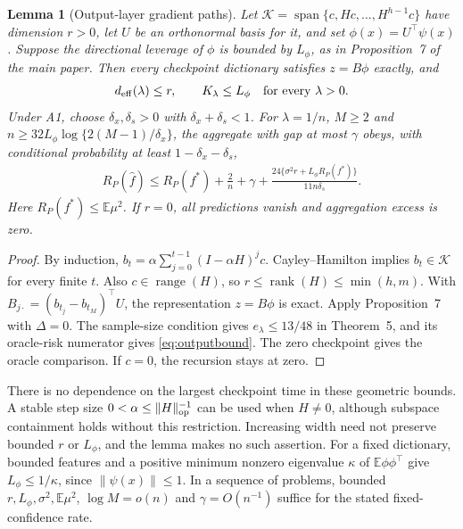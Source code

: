 \documentclass[pdflatex,sn-mathphys-ay]{sn-jnl}
\newtheorem{pathlemma}{Lemma}\renewcommand{\thepathlemma}{S\arabic{pathlemma}}
\theoremstyle{remark}\newtheorem{remark}[theorem]{Remark}
\newcommand{\E}{\mathbb E}
\begin{document}
\begin{pathlemma}[Output-layer gradient paths]\label{lem:outputpath}
Let $\mathcal K=\operatorname{span}\{c,Hc,\ldots,H^{h-1}c\}$ have dimension $r>0$, let $U$ be an orthonormal basis for it, and set $\phi(x)=U^\top\psi(x)$. Suppose the directional leverage of $\phi$ is bounded by $L_\phi$, as in Proposition~7 of the main paper. Then every checkpoint dictionary satisfies $z=B\phi$ exactly, and
\[
 d_{\rm eff}(\lambda)\leq r,\qquad K_\lambda\leq L_\phi
 \quad\text{for every }\lambda>0.
\]
Under A1, choose $\delta_x,\delta_s>0$ with $\delta_x+\delta_s<1$. For $\lambda=1/n$, $M\geq2$ and
$n\geq32L_\phi\log\{2(M-1)/\delta_x\}$, the aggregate with gap at most $\gamma$ obeys, with conditional probability at least $1-\delta_x-\delta_s$,
\begin{align}
 R_P(\hat f)\leq R_P(f^*)+\frac2n+\gamma
 +\frac{24\{\sigma^2r+L_\phi R_P(f^*)\}}{11n\delta_s}.
 \label{eq:outputbound}
\end{align}
Here $R_P(f^*)\leq\E\mu^2$. If $r=0$, all predictions vanish and aggregation excess is zero.
\end{pathlemma}
\begin{proof}
By induction, $b_t=\alpha\sum_{j=0}^{t-1}(I-\alpha H)^j c$. Cayley--Hamilton implies $b_t\in\mathcal K$ for every finite $t$. Also $c\in\operatorname{range}(H)$, so $r\leq\operatorname{rank}(H)\leq\min(h,m)$. With $B_{j\cdot}=(b_{t_j}-b_{t_M})^\top U$, the representation $z=B\phi$ is exact. Apply Proposition~7 with $\Delta=0$. The sample-size condition gives $e_\lambda\leq13/48$ in Theorem~5, and its oracle-risk numerator gives \eqref{eq:outputbound}. The zero checkpoint gives the oracle comparison. If $c=0$, the recursion stays at zero.
\end{proof}
There is no dependence on the largest checkpoint time in these geometric bounds. A stable step size $0<\alpha\leq\|H\|_{\rm op}^{-1}$ can be used when $H\ne0$, although subspace containment holds without this restriction. Increasing width need not preserve bounded $r$ or $L_\phi$, and the lemma makes no such assertion. For a fixed dictionary, bounded features and a positive minimum nonzero eigenvalue $\kappa$ of $\E\phi\phi^\top$ give $L_\phi\leq1/\kappa$, since $\|\psi(x)\|\leq1$. In a sequence of problems, bounded $r,L_\phi,\sigma^2,\E\mu^2$, $\log M=o(n)$ and $\gamma=O(n^{-1})$ suffice for the stated fixed-confidence rate.
\end{document}
